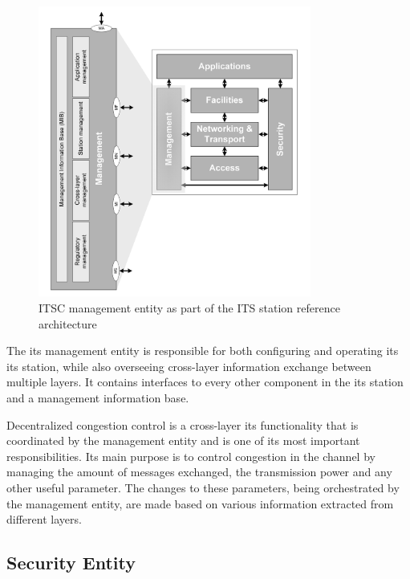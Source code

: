 \begin{figure}[htbp]
\centering
\includegraphics[width=0.8\textwidth]{Chapters/Figures/VANETs/management_entity.png}
   	\caption{ITSC management entity as part of the ITS station reference architecture~\cite{etsi_intelligent_2010}}
   	\label{fig:management_entity}
\end{figure}


The \gls{its} management entity is responsible for both configuring and operating its \gls{its} station, while also overseeing cross-layer information exchange between multiple layers. It contains interfaces to every other component in the \gls{its} station and a management information base. \cite{etsi_intelligent_2014}

Decentralized congestion control is a cross-layer \gls{its} functionality that is coordinated by the management entity and is one of its most important responsibilities. Its main purpose is to control congestion in the channel by managing the amount of messages exchanged, the transmission power and any other useful parameter. The changes to these parameters, being orchestrated by the management entity, are made based on various information extracted from different layers.
\cite{festag_cooperative_2014}

\subsection[Security Entity]{Security Entity}


